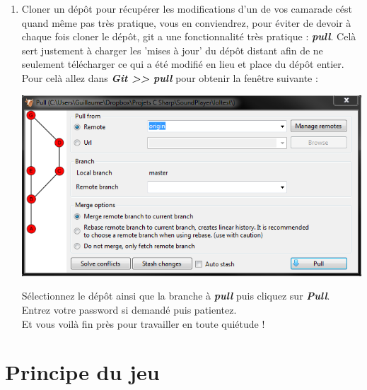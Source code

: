 \documentclass[a4paper]{article}
\begin{document}
\begin{enumerate}
    \item Cloner un dépôt pour récupérer les modifications d'un de vos
	camarade cést quand même pas très pratique, vous en conviendrez, pour
	éviter de devoir à chaque fois cloner le dépôt, git a une
	fonctionnalité très pratique : \textbf{\emph{pull}}. Celà sert
	justement à charger les 'mises à jour' du dépôt distant afin de ne
    seulement télécharger ce qui a été modifié en lieu et place du
    dépôt entier.\\
    Pour celà allez dans \textbf{\emph{Git >> pull}} pour obtenir la fenêtre
    suivante : \\
    \begin{center}
	\includegraphics[scale=0.7]{img/VS_pull.png}
    \end{center}

Sélectionnez le dépôt ainsi que la branche à \textbf{\emph{pull}} puis
cliquez sur \textbf{\emph{Pull}}. Entrez votre password si demandé puis
patientez. \\

Et vous voilà fin près pour travailler en toute quiétude !
\end{enumerate}

\section{Principe du jeu}
\end{document}
